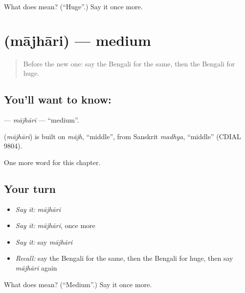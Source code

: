 \begin{tcolorbox}[breakable,colback=teal!4,colframe=teal!35!black,title={Before you move on}]
What does  mean? (\textquotedblleft{}Huge\textquotedblright{}.) Say it once more.
\end{tcolorbox}
\section[\texorpdfstring{\bn{মাঝারি} (mājhāri)}{মাঝারি (mājhāri)}]{ (mājhāri) — medium}

\label{lesson:BN-C193-majhari}



\begin{quote}
Before the new one: say the Bengali for the same, then the Bengali for huge.
\end{quote}

\subsection*{You'll want to know: }
\textbf{} — \emph{mājhāri} — \textquotedblleft{}medium\textquotedblright{}.

\begin{cousinweb}
\textbf{} (\emph{mājhāri}) is built on \emph{mājh}, \textquotedblleft{}middle\textquotedblright{}, from Sanskrit \emph{madhya}, \textquotedblleft{}middle\textquotedblright{} (CDIAL 9804).
\end{cousinweb}

\begin{grammarlens}[title={What you've built}]
One more word for this chapter.
\end{grammarlens}

\subsection*{Your turn}
\begin{itemize}
\raggedright
  \item \emph{Say it:} \emph{mājhāri}
  \item \emph{Say it:} \emph{mājhāri}, once more
  \item \emph{Say it:} say \emph{mājhāri}
  \item \emph{Recall:} say the Bengali for the same, then the Bengali for huge, then say \emph{mājhāri} again
\end{itemize}

\begin{tcolorbox}[breakable,colback=teal!4,colframe=teal!35!black,title={Before you move on}]
What does  mean? (\textquotedblleft{}Medium\textquotedblright{}.) Say it once more.
\end{tcolorbox}
